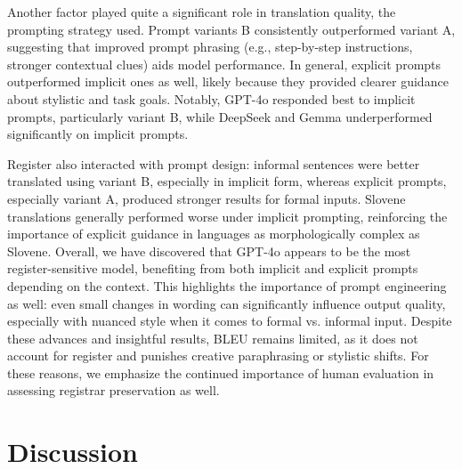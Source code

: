 \documentclass[fleqn,moreauthors,10pt]{ds_report}
\begin{document}
Another factor played quite a significant role in translation quality, the prompting strategy used. Prompt variants B consistently outperformed variant A, suggesting that improved prompt phrasing (e.g., step-by-step instructions, stronger contextual clues) aids model performance. In general, explicit prompts outperformed implicit ones as well, likely because they provided clearer guidance about stylistic and task goals. Notably, GPT-4o responded best to implicit prompts, particularly variant B, while DeepSeek and Gemma underperformed significantly on implicit prompts.


Register also interacted with prompt design: informal sentences were better translated using variant B, especially in implicit form, whereas explicit prompts, especially variant A, produced stronger results for formal inputs. Slovene translations generally performed worse under implicit prompting, reinforcing the importance of explicit guidance in languages as morphologically complex as Slovene.
Overall, we have discovered that GPT-4o appears to be the most register-sensitive model, benefiting from both implicit and explicit prompts depending on the context. This highlights the importance of prompt engineering as well: even small changes in wording can significantly influence output quality, especially with nuanced style when it comes to formal vs. informal input.
Despite these advances and insightful results, BLEU remains limited, as it does not account for register and punishes creative paraphrasing or stylistic shifts. For these reasons, we emphasize the continued importance of human evaluation in assessing registrar preservation as well.

		
		\section*{Discussion}
		
\end{document}
